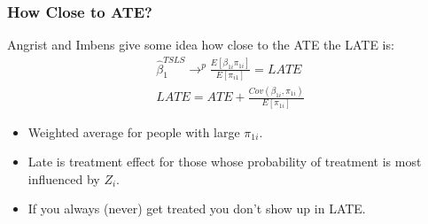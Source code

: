 \begin{frame}
\frametitle{How Close to ATE?}
Angrist and Imbens give some idea how close to the ATE the LATE is:
\begin{eqnarray*}
\widehat{\beta}_1^{TSLS} \rightarrow^p \frac{E[\beta_{1i} \pi_{1i}]}{E[\pi_{i1}]} = LATE \\
LATE = ATE + \frac{Cov(\beta_{1i},\pi_{1i})}{E[\pi_{1i}]}
\end{eqnarray*}
\begin{itemize}
\item Weighted average for people with large $\pi_{1i}$.
\item Late is treatment effect for those whose probability of treatment is most influenced by $Z_i$.
\item If you always (never) get treated you don't show up in LATE.
\end{itemize}
\end{frame}

